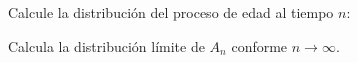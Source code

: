 Calcule la distribución del proceso de edad al tiempo $n$:

Calcula la distribución límite de $A_n$ conforme $n \rightarrow \infty$.

\afterstatement\pn